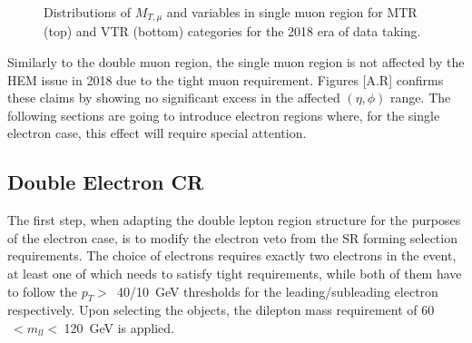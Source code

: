 \begin{figure}[htbp]
{    }
  \caption{Distributions of $M_{T,\mu}$ and \mindphinomu variables in single muon region for MTR (top) and VTR (bottom) categories for the 2018 era of data taking.}
  \label{fig:2018_Wmunu_2}
\end{figure}

\newpage



\hspace{10pt} Similarly to the double muon region, the single muon region is not affected by the HEM issue in 2018 due to the tight muon requirement. Figures [A.R] confirms these claims by showing no significant excess in the affected $(\eta, \phi)$ range. The following sections are going to introduce electron regions where, for the single electron case, this effect will require special attention.

\subsection{Double Electron CR}
\hspace{10pt} The first step, when adapting the double lepton region structure for the purposes of the electron case, is to modify the electron veto from the SR forming selection requirements. The choice of electrons requires exactly two electrons in the event, at least one of which needs to satisfy tight requirements, while both of them have to follow the $p_T>$~40/10~GeV thresholds for the leading/subleading electron respectively. Upon selecting the objects, the dilepton mass requirement of 60$~<m_{ll}<~$120~GeV is applied.


